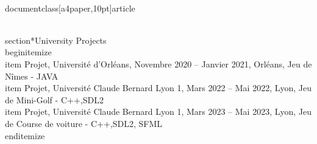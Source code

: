 \\documentclass[a4paper,10pt]{article}
\begin{document}
\\section*{University Projects}
\\begin{itemize}
\\item Projet, Université d’Orléans, Novembre 2020 – Janvier 2021, Orléans, Jeu de Nîmes - JAVA
\\item Projet, Université Claude Bernard Lyon 1, Mars 2022 – Mai 2022, Lyon, Jeu de Mini-Golf - C++,SDL2
\\item Projet, Université Claude Bernard Lyon 1, Mars 2023 – Mai 2023, Lyon, Jeu de Course de voiture - C++,SDL2, SFML
\\end{itemize}

\
\end{document}

